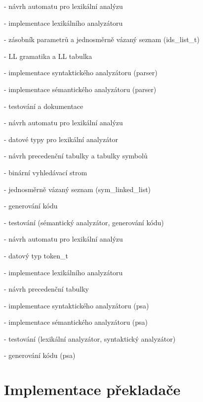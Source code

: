 \documentclass[a4paper, 12pt]{article}
\begin{document}
\begin{itemize}
\begin{minipage}{0.7\linewidth}
        \item[-] návrh automatu pro lexikální analýzu
        \item[-] implementace lexikálního analyzátoru
        \item[-] zásobník parametrů a jednosměrně vázaný seznam (ids\_list\_t)
        \item[-] LL gramatika a LL tabulka
        \item[-] implementace syntaktického analyzátoru (parser)
        \item[-] implementace sémantického analyzátoru (parser)
        \item[-] testování a dokumentace
        \item[]
        
        \item[-] návrh automatu pro lexikální analýzu
        \item[-] datové typy pro lexikální analyzátor
        \item[-] návrh precedenční tabulky a tabulky symbolů
        \item[-] binární vyhledávací strom
        \item[-] jednosměrně vázaný seznam (sym\_linked\_list)
        \item[-] generování kódu
        \item[-] testování (sémantický analyzátor, generování kódu)
        \item[]
        
        \item[-] návrh automatu pro lexikální analýzu
        \item[-] datový typ token\_t
        \item[-] implementace lexikálního analyzátoru
        \item[-] návrh precedenční tabulky
        \item[-] implementace syntaktického analyzátoru (psa)
        \item[-] implementace sémantického analyzátoru (psa)
        \item[-] testování (lexikální analyzátor, syntaktický analyzátor)
        \item[-] generování kódu (psa)
    \end{minipage}
\end{itemize}

\newpage

\section{Implementace překladače}
\end{document}
